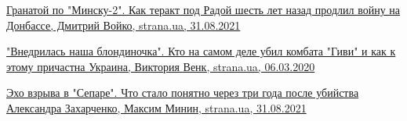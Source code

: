  
 
 
 
 

\href{https://strana.news/news/351230-vzryv-hranaty-u-verkhovnoj-rady-chto-s-delom-humenjuka-i-krajnjaka-spustja-6-let.html}{%
Гранатой по "Минску-2". Как теракт под Радой шесть лет назад продлил войну на Донбассе, %
Дмитрий Войко, strana.ua, 31.08.2021%
}

\href{https://strana.news/news/253390-smert-hivi-kak-ukrainskie-spetssluzhby-ubili-komandira-somali.html}{%
"Внедрилась наша блондиночка". Кто на самом деле убил комбата "Гиви" и как к этому причастна Украина, %
Виктория Венк, strana.ua, 06.03.2020%
}

\href{https://strana.news/news/351170-ubijstvo-zakharchenko-chto-stalo-ponjatno-cherez-tri-hoda-posle-vzryva-v-separe.html}{%
Эхо взрыва в "Сепаре". Что стало понятно через три года после убийства Александра Захарченко, %
Максим Минин, strana.ua, 31.08.2021%
}
